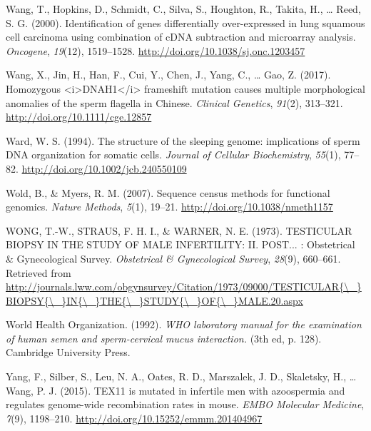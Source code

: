 \documentclass[12pt,twoside]{reedthesis}
\theoremstyle{definition}
\theoremstyle{definition}
\theoremstyle{remark}
\begin{document}
  \hypertarget{ref-Wang2000}{}
  Wang, T., Hopkins, D., Schmidt, C., Silva, S., Houghton, R., Takita, H.,
  \ldots{} Reed, S. G. (2000). Identification of genes differentially
  over-expressed in lung squamous cell carcinoma using combination of cDNA
  subtraction and microarray analysis. \emph{Oncogene}, \emph{19}(12),
  1519--1528. \url{http://doi.org/10.1038/sj.onc.1203457}
  
  \hypertarget{ref-Wang2017}{}
  Wang, X., Jin, H., Han, F., Cui, Y., Chen, J., Yang, C., \ldots{} Gao,
  Z. (2017). Homozygous
  \textless{}i\textgreater{}DNAH1\textless{}/i\textgreater{} frameshift
  mutation causes multiple morphological anomalies of the sperm flagella
  in Chinese. \emph{Clinical Genetics}, \emph{91}(2), 313--321.
  \url{http://doi.org/10.1111/cge.12857}
  
  \hypertarget{ref-Ward1994}{}
  Ward, W. S. (1994). The structure of the sleeping genome: implications
  of sperm DNA organization for somatic cells. \emph{Journal of Cellular
  Biochemistry}, \emph{55}(1), 77--82.
  \url{http://doi.org/10.1002/jcb.240550109}
  
  \hypertarget{ref-Wold2007}{}
  Wold, B., \& Myers, R. M. (2007). Sequence census methods for functional
  genomics. \emph{Nature Methods}, \emph{5}(1), 19--21.
  \url{http://doi.org/10.1038/nmeth1157}
  
  \hypertarget{ref-WONG1973}{}
  WONG, T.-W., STRAUS, F. H. I., \& WARNER, N. E. (1973). TESTICULAR
  BIOPSY IN THE STUDY OF MALE INFERTILITY: II. POST... : Obstetrical \&
  Gynecological Survey. \emph{Obstetrical \& Gynecological Survey},
  \emph{28}(9), 660--661. Retrieved from
  \href{http://journals.lww.com/obgynsurvey/Citation/1973/09000/TESTICULAR\%7B/_\%7DBIOPSY\%7B/_\%7DIN\%7B/_\%7DTHE\%7B/_\%7DSTUDY\%7B/_\%7DOF\%7B/_\%7DMALE.20.aspx}{http://journals.lww.com/obgynsurvey/Citation/1973/09000/TESTICULAR\{\textbackslash{}\_\}BIOPSY\{\textbackslash{}\_\}IN\{\textbackslash{}\_\}THE\{\textbackslash{}\_\}STUDY\{\textbackslash{}\_\}OF\{\textbackslash{}\_\}MALE.20.aspx}
  
  \hypertarget{ref-WorldHealthOrganization1992}{}
  World Health Organization. (1992). \emph{WHO laboratory manual for the
  examination of human semen and sperm-cervical mucus interaction.} (3th
  ed, p. 128). Cambridge University Press.
  
  \hypertarget{ref-Yang2015}{}
  Yang, F., Silber, S., Leu, N. A., Oates, R. D., Marszalek, J. D.,
  Skaletsky, H., \ldots{} Wang, P. J. (2015). TEX11 is mutated in
  infertile men with azoospermia and regulates genome-wide recombination
  rates in mouse. \emph{EMBO Molecular Medicine}, \emph{7}(9), 1198--210.
  \url{http://doi.org/10.15252/emmm.201404967}
  
\end{document}
